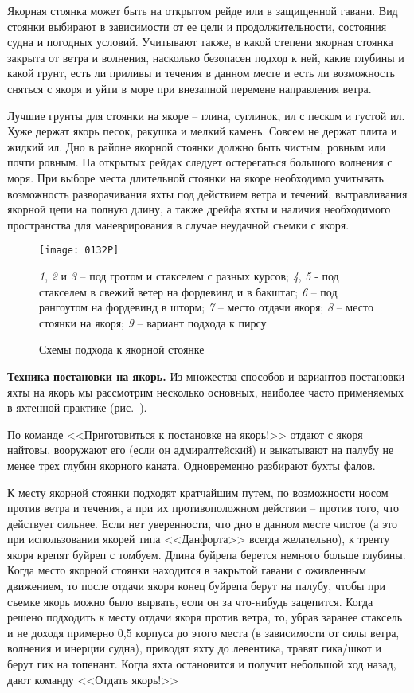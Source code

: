 Якорная стоянка может быть на открытом рейде или в защищенной гавани. Вид стоянки выбирают в зависимости от ее цели и продолжительности, состояния судна и погодных условий. Учитывают также, в какой степени якорная стоянка закрыта от ветра и волнения, насколько безопасен подход к ней, какие глубины и какой грунт, есть ли приливы и течения в данном месте и есть ли возможность сняться с якоря и уйти в море при внезапной перемене направления ветра.

Лучшие грунты для стоянки на якоре \--- глина, суглинок, ил с песком и густой ил. Хуже держат якорь песок, ракушка и мелкий камень. Совсем не держат плита и жидкий ил. Дно в районе якорной стоянки должно быть чистым, ровным или почти ровным. На открытых рейдах следует остерегаться большого волнения с моря. При выборе места длительной стоянки на якоре необходимо учитывать возможность разворачивания яхты под действием ветра и течений, вытравливания якорной цепи на полную длину, а также дрейфа яхты и наличия необходимого пространства для маневрирования в случае неудачной съемки с якоря.

\begin{figure*}[htb]
  \centering{}
  \texttt{[image: 0132P]}
  \caption{Схемы подхода к якорной стоянке}
  \label{fig:132}
  \small
  \centering{}
  \textit{1}, \textit{2} и \textit{3} \--- под гротом и стакселем с разных курсов; \textit{4}, \textit{5} \-- под стакселем в свежий ветер на фордевинд и в бакштаг; \textit{6} \--- под рангоутом на фордевинд в шторм; \textit{7} \--- место отдачи якоря; \textit{8} \--- место стоянки на якоря; \textit{9} \--- вариант подхода к пирсу 
\end{figure*}

\textbf{Техника постановки на якорь.} Из множества способов и вариантов постановки яхты на якорь мы рассмотрим несколько основных, наиболее часто применяемых в яхтенной практике (рис.~). 

По команде <<Приготовиться к постановке на якорь!>> отдают с якоря найтовы, вооружают его (если он адмиралтейский) и выкатывают на палубу не менее трех глубин якорного каната. Одновременно разбирают бухты фалов. 

К месту якорной стоянки подходят кратчайшим путем, по возможности носом против ветра и течения, а при их противоположном действии \--- против того, что действует сильнее. Если нет уверенности, что дно в данном месте чистое (а это при использовании якорей типа <<Данфорта>> всегда желательно), к тренту якоря крепят буйреп с томбуем. Длина буйрепа берется немного больше глубины. Когда место якорной стоянки находится в закрытой гавани с оживленным движением, то после отдачи якоря конец буйрепа берут на палубу, чтобы при съемке якорь можно было вырвать, если он за что-нибудь зацепится. Когда решено подходить к месту отдачи якоря против ветра, то, убрав заранее стаксель и не доходя примерно 0,5 корпуса до этого места (в зависимости от силы ветра, волнения и инерции судна), приводят яхту до левентика, травят гика\-/шкот и берут гик на топенант. Когда яхта остановится и получит небольшой ход назад, дают команду <<Отдать якорь!>>

